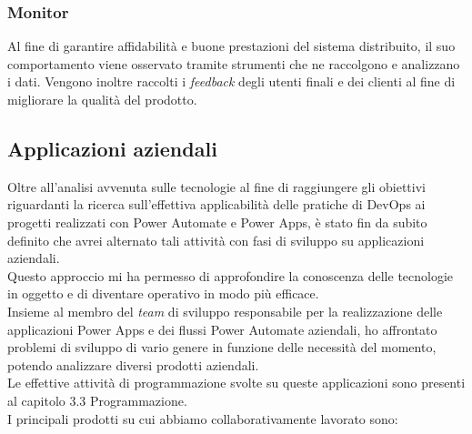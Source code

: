 \subsubsection*{Monitor}
Al fine di garantire affidabilità e buone prestazioni del sistema distribuito, il suo comportamento viene osservato tramite strumenti che ne raccolgono e analizzano i dati. 
Vengono inoltre raccolti i \emph{feedback} degli utenti finali e dei clienti al fine di migliorare la qualità del prodotto. 

\subsection{Applicazioni aziendali}
Oltre all'analisi avvenuta sulle tecnologie al fine di raggiungere gli obiettivi riguardanti la ricerca sull'effettiva applicabilità delle pratiche di \gls{DevOps} ai progetti realizzati con Power Automate e Power Apps, è stato fin da subito definito che avrei alternato tali attività con fasi di sviluppo su applicazioni aziendali.\\  
Questo approccio mi ha permesso di approfondire la conoscenza delle tecnologie in oggetto e di diventare operativo in modo più efficace.\\
Insieme al membro del \emph{team} di sviluppo responsabile per la realizzazione delle applicazioni Power Apps e dei flussi Power Automate aziendali, ho affrontato problemi di sviluppo di vario genere in funzione delle necessità del momento, potendo analizzare diversi prodotti aziendali.\\
Le effettive attività di programmazione svolte su queste applicazioni sono presenti al capitolo 3.3 Programmazione.\\
I principali prodotti su cui abbiamo collaborativamente lavorato sono:
